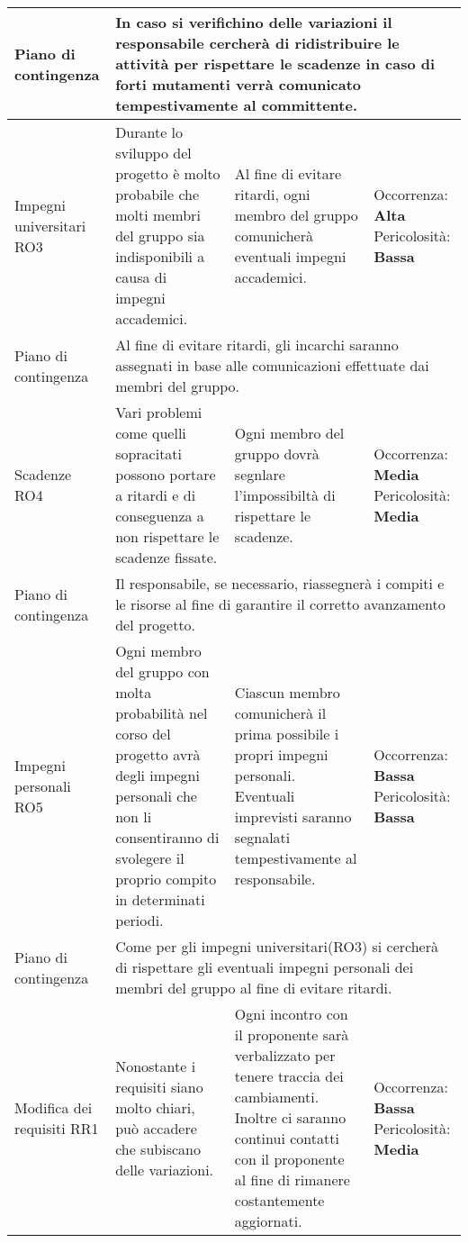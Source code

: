 \begin{center}
\begin{longtable}{|p{}|p{}|p{}|p{}|}
		\hline
		\centering Piano di contingenza & \multicolumn{3}{p{0.83\textwidth}}{In caso si verifichino delle variazioni il responsabile cercherà di ridistribuire le attività per rispettare le scadenze  in caso di forti mutamenti verrà comunicato tempestivamente al committente.  } \\
		\hline
		\centering Impegni universitari RO3& Durante lo sviluppo del progetto è molto probabile che molti membri del gruppo sia indisponibili a causa di impegni accademici.  &Al fine di evitare ritardi, ogni membro del gruppo comunicherà eventuali impegni accademici. & Occorrenza: \textbf{Alta} Pericolosità: \textbf{Bassa}\\
		\hline
		\centering Piano di contingenza & \multicolumn{3}{p{0.83\textwidth}}{Al fine di evitare ritardi, gli incarchi saranno assegnati in base alle comunicazioni effettuate dai membri del gruppo.} \\
		\hline
		\centering Scadenze RO4& Vari problemi come quelli sopracitati possono portare a ritardi e di conseguenza a non rispettare le scadenze fissate.  & Ogni membro del gruppo dovrà segnlare l'impossibiltà di rispettare le scadenze. & Occorrenza: \textbf{Media} Pericolosità: \textbf{Media}\\
		\hline
		\centering Piano di contingenza & \multicolumn{3}{p{0.83\textwidth}}{Il responsabile, se necessario, riassegnerà i compiti e le risorse al fine di garantire il corretto avanzamento del progetto.} \\
		\hline
		\centering Impegni personali RO5& Ogni membro del gruppo con molta probabilità nel corso del progetto avrà degli impegni personali che non li consentiranno di svolegere il proprio compito in determinati periodi. & Ciascun membro comunicherà il prima possibile i propri impegni personali. Eventuali imprevisti saranno segnalati tempestivamente al responsabile. & Occorrenza: \textbf{Bassa} Pericolosità: \textbf{Bassa}\\
		\hline
		\centering Piano di contingenza & \multicolumn{3}{p{0.83\textwidth}}{Come per gli impegni universitari(RO3) si cercherà di rispettare gli eventuali impegni personali dei membri del gruppo al fine di evitare ritardi.} \\
		\hline
		\centering Modifica dei requisiti RR1& Nonostante i requisiti siano molto chiari, può accadere che subiscano delle variazioni.  & Ogni incontro con il proponente sarà verbalizzato per tenere traccia dei cambiamenti. Inoltre ci saranno continui contatti con il proponente al fine di rimanere costantemente aggiornati. & Occorrenza: \textbf{Bassa} Pericolosità: \textbf{Media}\\

\end{longtable}
\end{center}

